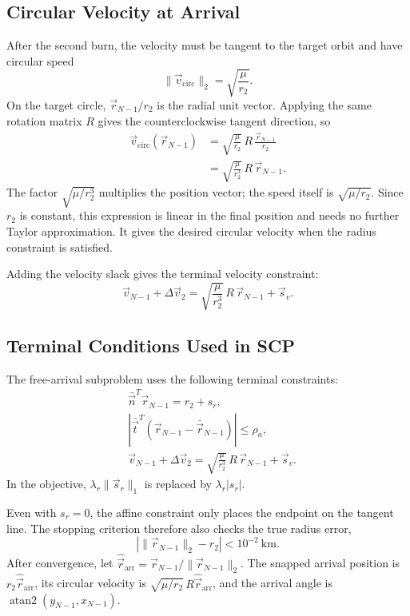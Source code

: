 \documentclass{article}
\begin{document}
\subsection{Circular Velocity at Arrival}

After the second burn, the velocity must be tangent to the target orbit and have circular speed
\[
\|\vec{v}_{\mathrm{circ}}\|_2=\sqrt{\frac{\mu}{r_2}}.
\]
On the target circle, $\vec{r}_{N-1}/r_2$ is the radial unit vector. Applying the same rotation matrix $R$ gives the counterclockwise tangent direction, so
\begin{align*}
\vec{v}_{\mathrm{circ}}(\vec{r}_{N-1})
&=\sqrt{\frac{\mu}{r_2}}\,R\,\frac{\vec{r}_{N-1}}{r_2}\\
&=\sqrt{\frac{\mu}{r_2^3}}\,R\,\vec{r}_{N-1}.
\end{align*}
The factor $\sqrt{\mu/r_2^3}$ multiplies the position vector; the speed itself is $\sqrt{\mu/r_2}$. Since $r_2$ is constant, this expression is linear in the final position and needs no further Taylor approximation. It gives the desired circular velocity when the radius constraint is satisfied.

Adding the velocity slack gives the terminal velocity constraint:
\[
\boxed{\vec{v}_{N-1}+\Delta\vec{v}_2
=\sqrt{\frac{\mu}{r_2^3}}\,R\,\vec{r}_{N-1}+\vec{s}_v.}
\]

\subsection*{Terminal Conditions Used in SCP}

The free-arrival subproblem uses the following terminal constraints:
\[
\boxed{
\begin{aligned}
&\bar{\vec{n}}^T\vec{r}_{N-1}=r_2+s_r,\\
&\left|\bar{\vec{t}}^T\left(\vec{r}_{N-1}-\bar{\vec{r}}_{N-1}\right)\right|\le\rho_a,\\
&\vec{v}_{N-1}+\Delta\vec{v}_2
=\sqrt{\frac{\mu}{r_2^3}}\,R\,\vec{r}_{N-1}+\vec{s}_v.
\end{aligned}
}
\]
In the objective, $\lambda_r\|\vec{s}_r\|_1$ is replaced by $\lambda_r|s_r|$.

Even with $s_r=0$, the affine constraint only places the endpoint on the tangent line. The stopping criterion therefore also checks the true radius error,
\[
\left|\|\vec{r}_{N-1}\|_2-r_2\right|<10^{-2}\ \mathrm{km}.
\]
After convergence, let $\hat{\vec{r}}_{\mathrm{arr}}=\vec{r}_{N-1}/\|\vec{r}_{N-1}\|_2$. The snapped arrival position is $r_2\hat{\vec{r}}_{\mathrm{arr}}$, its circular velocity is $\sqrt{\mu/r_2}\,R\hat{\vec{r}}_{\mathrm{arr}}$, and the arrival angle is $\operatorname{atan2}(y_{N-1},x_{N-1})$.
\end{document}
